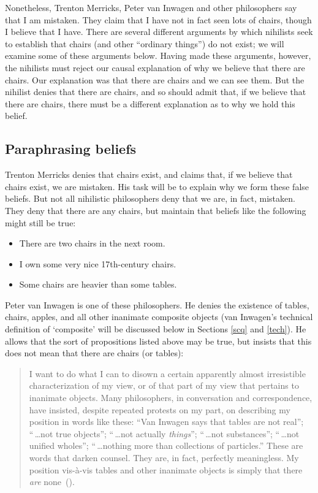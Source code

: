 \documentclass[12pt,twoside]{reedfancy}
\begin{document}
\begin{spacing}{1.25}
Nonetheless, Trenton Merricks, Peter van Inwagen and other
philosophers say that I am mistaken.  They claim that I have not in
fact seen lots of chairs, though I believe that I have.  There are
several different arguments by which nihilists seek to establish that
chairs (and other ``ordinary things'') do not exist; we will examine
some of these arguments below.  Having made these arguments, however,
the nihilists must reject our causal explanation of why we believe
that there are chairs.  Our explanation was that there are chairs and
we can see them.  But the nihilist denies that there are chairs, and
so should admit that, if we believe that there are chairs, there must
be a different explanation as to why we hold this belief.

\subsection{Paraphrasing beliefs}
\label{paraphrase}
Trenton Merricks denies that chairs exist, and claims that, if we
believe that chairs exist, we are mistaken.  His task will be to
explain why we form these false beliefs.  But not all nihilistic
philosophers deny that we are, in fact, mistaken.  They deny that
there are any chairs, but maintain that beliefs like the following
might still be true:

\begin{itemize}
  \item There are two chairs in the next room.
  \item I own some very nice 17th-century chairs.
  \item Some chairs are heavier than some tables.
\end{itemize}

Peter van Inwagen is one of these philosophers.  He denies the
existence of tables, chairs, apples, and all other inanimate composite
objects (van Inwagen's technical definition of `composite' will be
discussed below in Sections \ref{scq} and \ref{tech}).  He allows that
the sort of propositions listed above may be true, but insists that
this does not mean that there are chairs (or tables):
\begin{quote}
I want to do what I can to disown a certain apparently almost
irresistible characterization of my view, or of that part of my view
that pertains to inanimate objects.  Many philosophers, in
conversation and correspondence, have insisted, despite repeated
protests on my part, on describing my position in words like these:
``Van Inwagen says that tables are not real''; ``\,\ldots not true
objects''; ``\,\ldots not actually {\em things}''; ``\,\ldots not
substances''; ``\,\ldots not unified wholes''; ``\,\ldots nothing more
than collections of particles.''  These are words that darken counsel.
They are, in fact, perfectly meaningless.  My position vis-\`{a}-vis
tables and other inanimate objects is simply that there {\em are}
none~(\citeyear[99]{inwagen1995}).
\end{quote}


\end{spacing}
\end{document}
